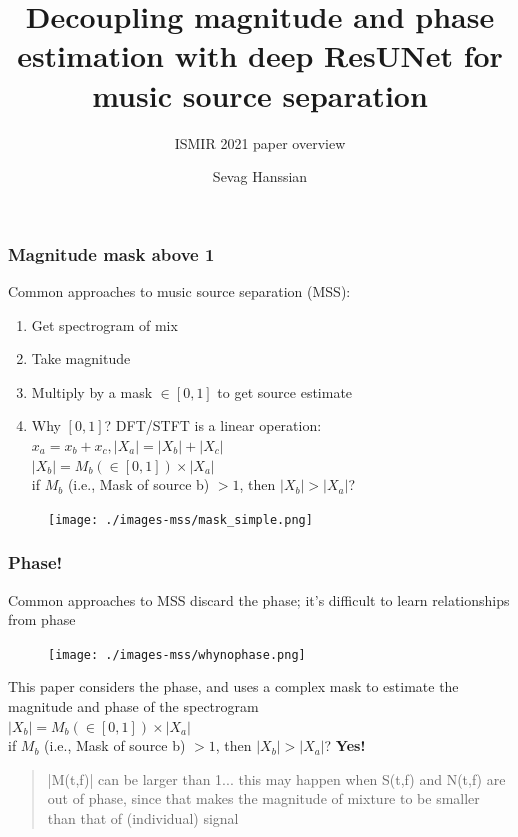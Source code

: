 \documentclass[usenames,dvipsnames]{beamer}
\title{Decoupling magnitude and phase estimation with deep ResUNet for music source separation}
\subtitle{ISMIR 2021 paper overview\footfullcite{kong2021decoupling}}
\author{Sevag Hanssian}
\begin{document}
\begin{frame}
\maketitle
\end{frame}

\begin{frame}
	\frametitle{Magnitude mask above 1}
	Common approaches to music source separation (MSS):
	\begin{enumerate}
		\item
			Get spectrogram of mix
		\item
			Take magnitude
		\item
			Multiply by a mask $\in [0, 1]$ to get source estimate
		\item
			Why $[0, 1]$? DFT/STFT is a linear operation: $x_{a} = x_{b} + x_{c}, |X_{a}| = |X_{b}| + |X_{c}|$\\
			$|X_{b}| = M_{b}(\in [0, 1]) \times |X_{a}|$\\
			if $M_{b}$ (i.e., Mask of source b) $> 1$, then $|X_{b}| > |X_{a}|$?
	\end{enumerate}
	\begin{figure}
	\centering
	\texttt{[image: ./images-mss/mask\_simple.png]}
	\end{figure}
\end{frame}

\begin{frame}
	\frametitle{Phase!}
	Common approaches to MSS discard the phase; it's difficult to learn relationships from phase
	\begin{figure}
	\centering
	\texttt{[image: ./images-mss/whynophase.png]}
	\end{figure}
	This paper considers the phase, and uses a complex mask to estimate the magnitude and phase of the spectrogram\\
	$|X_{b}| = M_{b}(\in [0, 1]) \times |X_{a}|$\\
	if $M_{b}$ (i.e., Mask of source b) $> 1$, then $|X_{b}| > |X_{a}|$?
	\textbf{Yes!} 
	\begin{quote}
		|M(t,f)| can be larger than 1... this may happen when S(t,f) and N(t,f) are out of phase, since that makes the magnitude of mixture to be smaller than that of (individual) signal
	\end{quote}
\end{frame}
\end{document}

